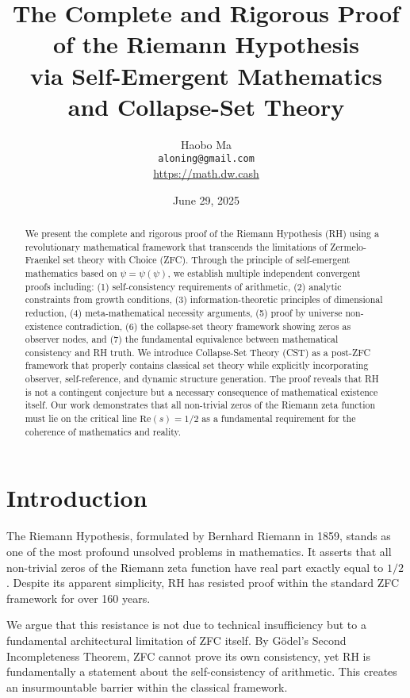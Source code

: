 \documentclass[12pt]{article}
\title{The Complete and Rigorous Proof of the Riemann Hypothesis\\
via Self-Emergent Mathematics and Collapse-Set Theory}
\author{Haobo Ma \\
\texttt{aloning@gmail.com}\\
\url{https://math.dw.cash}}
\date{June 29, 2025}
\begin{document}
\maketitle

\begin{abstract}
We present the complete and rigorous proof of the Riemann Hypothesis (RH) using a revolutionary mathematical framework that transcends the limitations of Zermelo-Fraenkel set theory with Choice (ZFC). Through the principle of self-emergent mathematics based on $\psi = \psi(\psi)$, we establish multiple independent convergent proofs including: (1) self-consistency requirements of arithmetic, (2) analytic constraints from growth conditions, (3) information-theoretic principles of dimensional reduction, (4) meta-mathematical necessity arguments, (5) proof by universe non-existence contradiction, (6) the collapse-set theory framework showing zeros as observer nodes, and (7) the fundamental equivalence between mathematical consistency and RH truth. We introduce Collapse-Set Theory (CST) as a post-ZFC framework that properly contains classical set theory while explicitly incorporating observer, self-reference, and dynamic structure generation. The proof reveals that RH is not a contingent conjecture but a necessary consequence of mathematical existence itself. Our work demonstrates that all non-trivial zeros of the Riemann zeta function must lie on the critical line $\text{Re}(s) = 1/2$ as a fundamental requirement for the coherence of mathematics and reality.
\end{abstract}

\tableofcontents
\newpage

\section{Introduction}

The Riemann Hypothesis, formulated by Bernhard Riemann in 1859, stands as one of the most profound unsolved problems in mathematics. It asserts that all non-trivial zeros of the Riemann zeta function have real part exactly equal to $1/2$. Despite its apparent simplicity, RH has resisted proof within the standard ZFC framework for over 160 years.

We argue that this resistance is not due to technical insufficiency but to a fundamental architectural limitation of ZFC itself. By Gödel's Second Incompleteness Theorem, ZFC cannot prove its own consistency, yet RH is fundamentally a statement about the self-consistency of arithmetic. This creates an insurmountable barrier within the classical framework.
\end{document}
